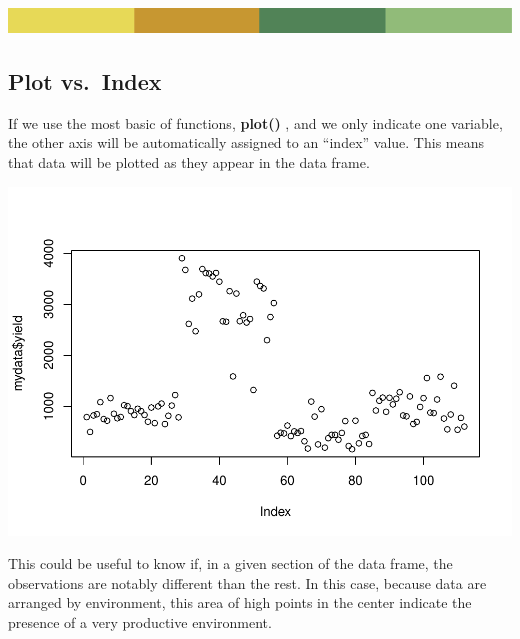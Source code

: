 \documentclass[
]{book}
\newenvironment{Shaded}{\begin{snugshade}}{\end{snugshade}}
\newcommand{\CommentTok}[1]{\textcolor[rgb]{0.56,0.35,0.01}{\textit{#1}}}
\newcommand{\FunctionTok}[1]{\textcolor[rgb]{0.00,0.00,0.00}{#1}}
\newcommand{\NormalTok}[1]{#1}
\newcommand{\OtherTok}[1]{\textcolor[rgb]{0.56,0.35,0.01}{#1}}
\newcommand{\SpecialCharTok}[1]{\textcolor[rgb]{0.00,0.00,0.00}{#1}}
\newcommand{\StringTok}[1]{\textcolor[rgb]{0.31,0.60,0.02}{#1}}
\begin{document}
\includegraphics{rsrstrip.png}

\hypertarget{plot-vs.-index}{%
\subsection{Plot vs.~Index}\label{plot-vs.-index}}

If we use the most basic of functions, \textbf{plot() }, and we only indicate one variable, the other axis will be automatically assigned to an ``index'' value. This means that data will be plotted as they appear in the data frame.

\begin{Shaded}
\end{Shaded}

\includegraphics{PPB-Toolkit-for-R-and-R-Studio_files/figure-latex/unnamed-chunk-50-1.pdf}

This could be useful to know if, in a given section of the data frame, the observations are notably different than the rest. In this case, because data are arranged by environment, this area of high points in the center indicate the presence of a very productive environment.
\end{document}
